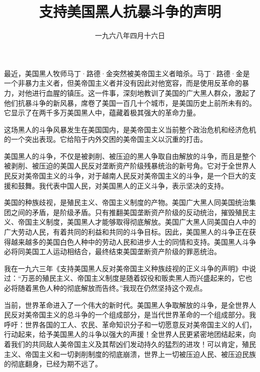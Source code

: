 
\title{支持美国黑人抗暴斗争的声明}
\date{一九六八年四月十六日}
\maketitle


最近，美国黑人牧师马丁·路德·金突然被美帝国主义者暗杀。马丁·路德·金是一个非暴力主义者，但美帝国主义者并没有因此对他宽容，而是使用反革命的暴力，对他进行血腥的镇压。这一件事，深刻地教训了美国的广大黑人群众，激起了他们抗暴斗争的新风暴，席卷了美国一百几十个城市，是美国历史上前所未有的。它显示了在两千多万美国黑人中，蕴藏着极其强大的革命力量。

这场黑人的斗争风暴发生在美国国内，是美帝国主义当前整个政治危机和经济危机的一个突出表现。它给陷于内外交困的美帝国主义以沉重的打击。

美国黑人的斗争，不仅是被剥削、被压迫的黑人争取自由解放的斗争，而且是整个被剥削、被压迫的美国人民反对垄断资产阶级残暴统治的新号角。它对于全世界人民反对美帝国主义的斗争，对于越南人民反对美帝国主义的斗争，是一个巨大的支援和鼓舞。我代表中国人民，对美国黑人的正义斗争，表示坚决的支持。

美国的种族歧视，是殖民主义、帝国主义制度的产物。美国广大黑人同美国统治集团之间的矛盾，是阶级矛盾。只有推翻美国垄断资产阶级的反动统治，摧毁殖民主义、帝国主义制度，美国黑人才能够取得彻底解放。美国广大黑人同美国白人中的广大劳动人民，有着共同的利益和共同的斗争目标。因此，美国黑人的斗争正在获得越来越多的美国白色人种中的劳动人民和进步人士的同情和支持。美国黑人斗争必将同美国工人运动相结合，最终结束美国垄断资产阶级的罪恶统治。

我在一九六三年《支持美国黑人反对美帝国主义种族歧视的正义斗争的声明》中说过：“万恶的殖民主义、帝国主义制度是随着奴役和贩卖黑人而兴盛起来的，它也必将随着黑色人种的彻底解放而告终。”我现在仍然坚持这个观点。

当前，世界革命进入了一个伟大的新时代。美国黑人争取解放的斗争，是全世界人民反对美帝国主义的总斗争的一个组成部分，是当代世界革命的一个组成部分。我呼吁：世界各国的工人、农民、革命知识分子和一切愿意反对美帝国主义的人们，行动起来，给予美国黑人的斗争以强大的声援！全世界人民更紧密地团结起来，向着我们的共同敌人美帝国主义及其帮凶们发动持久的猛烈的进攻！可以肯定，殖民主义、帝国主义和一切剥削制度的彻底崩溃，世界上一切被压迫人民、被压迫民族的彻底翻身，已经为期不远了。

